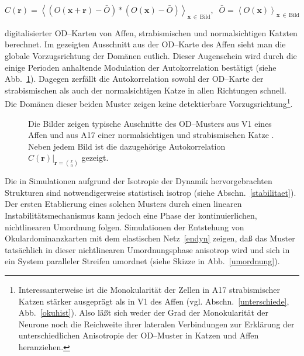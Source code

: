 \begin{small}
\begin{equation}
C(\mathbf{r})=\left<\left(O(\mathbf{x+r})-\bar{O}\right)\ast\left(O(\mathbf{x})-\bar{O}\right)\right>_{\mathbf{x}\,\in\,\text{Bild}},\;\;\bar{O}=\left<O(\mathbf{x})\right>_{\mathbf{x}\,\in\,\text{Bild}}
\label{autocorr}
\end{equation}
\end{small}

\noindent digitalisierter OD--Karten von Affen, strabismischen und
normalsichtigen Katzten berechnet.  Im gezeigten Ausschnitt aus der
OD--Karte des Affen sieht man die globale Vorzugsrichtung der Domänen
eutlich.  Dieser Augenschein wird durch die einige Perioden anhaltende
Modulation der Autokorrelation bestätigt (siehe Abb.~\ref{odcorr}).
Dagegen zerfällt die Autokorrelation sowohl der OD--Karte der
strabismischen als auch der normalsichtigen Katze in allen Richtungen
schnell. Die Domänen dieser beiden Muster zeigen keine detektierbare
Vorzugsrichtung\footnote{Interessanterweise ist die Monokularität der
Zellen in A17 strabismischer Katzen stärker ausgeprägt als in V1 des
Affen (vgl. Abschn.~\ref{unterschiede}, Abb.~\ref{okuhist}).  Also läßt
sich weder der Grad der Monokularität der Neurone noch die Reichweite
ihrer lateralen Verbindungen zur Erklärung der unterschiedlichen
Anisotropie der OD--Muster in Katzen und Affen heranziehen.}.
\setcounter{footnote}{1}

\begin{figure}[h!]
\centering
{}
\caption{Die Bilder zeigen typische Auschnitte des OD--Musters aus V1 eines
Affen \protect{} und aus A17 einer normalsichtigen und strabismischen Katze
\protect{}. Neben jedem Bild ist die dazugehörige Autokorrelation
$C(\mathbf{r})\vert_{\mathbf{r}={\binom{x}{0}}}$ gezeigt.}
\label{odcorr}
\end{figure}

Die in Simulationen aufgrund der Isotropie der Dynamik
hervorgebrachten Strukturen sind notwendigerweise statistisch isotrop
(siehe Abschn.~\ref{stabilitaet}).  Der ersten Etablierung eines solchen
Musters durch einen linearen Instabilitätsmechanismus kann jedoch
eine Phase der kontinuierlichen, nichtlinearen Umordnung folgen.  Simulationen der Entstehung von Okulardominanzkarten mit
dem elastischen Netz~\eqref{endyn} zeigen, daß das Muster tatsächlich in
dieser nichtlinearen Umordnungsphase anisotrop wird und sich in ein System
paralleler Streifen umordnet (siehe Skizze in
Abb.~\ref{umordnung}).

